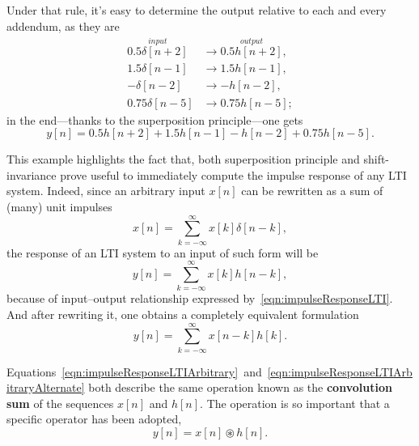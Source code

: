 \documentclass[\documentfontsize, twocolumn]{\classname}
\begin{document}
Under that rule, it's easy to determine the output relative to each and every addendum, as they are
\begin{align*}
    \overset{input}{0.5\delta[n+2]} & \longrightarrow \overset{output}{0.5h[n+2]},\\
    1.5\delta[n-1] & \longrightarrow 1.5h[n-1],\\
    -\delta[n-2] & \longrightarrow -h[n-2],\\
    0.75\delta[n-5] & \longrightarrow 0.75h[n-5];
\end{align*}
in the end---thanks to the superposition principle---one gets
\[
    y[n] = 0.5h[n+2] + 1.5h[n-1] - h[n-2] + 0.75h[n-5].
\]

This example highlights the fact that, both superposition principle and shift-invariance prove useful to immediately compute the impulse response of any LTI system. Indeed, since an arbitrary input $x[n]$ can be rewritten as a sum of (many) unit impulses
\begin{equation}\label{eqn:inputAsSumOfImpulses}
    x[n] = \sum_{k=-\infty}^\infty x[k] \delta[n-k],
\end{equation}
the response of an LTI system to an input of such form will be
\begin{equation}\label{eqn:impulseResponseLTIArbitrary}
    y[n] = \sum_{k=-\infty}^\infty x[k] h[n-k],
\end{equation}
because of input--output relationship expressed by~\ref{eqn:impulseResponseLTI}. And after rewriting it, one obtains a completely equivalent formulation
\begin{equation}\label{eqn:impulseResponseLTIArbitraryAlternate}
    y[n] = \sum_{k=-\infty}^\infty x[n-k] h[k].
\end{equation}

Equations~\ref{eqn:impulseResponseLTIArbitrary}~and~\ref{eqn:impulseResponseLTIArbitraryAlternate} both describe the same operation known as the \textbf{convolution sum} of the sequences $x[n]$ and $h[n]$. The operation is so important that a specific operator has been adopted,
\begin{equation}\label{eqn:convolutionSum}
    y[n] = x[n] \circledast h[n].
\end{equation}
\end{document}
